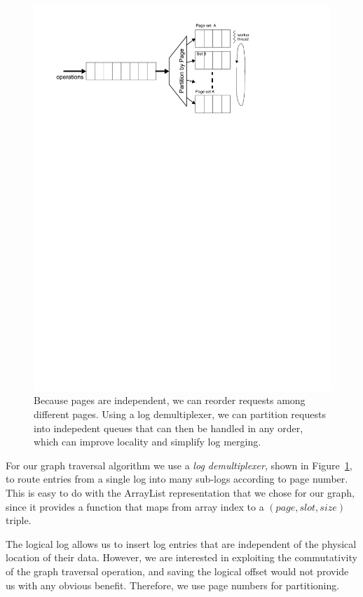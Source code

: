 \documentclass[10pt,letterpaper,twocolumn,english]{article}
\begin{document}
\begin{figure}
\includegraphics[width=1\columnwidth]{graph-traversal.pdf}
\caption{\sf\label{fig:multiplexor} Because pages are independent, we
can reorder requests among different pages. Using a log demultiplexer,
we can partition requests into indepedent queues that can then be
handled in any order, which can improve locality and simplify log
merging.}
\end{figure}

For our graph traversal algorithm we use a {\em log demultiplexer},
shown in Figure~\ref{fig:multiplexor}, to route entries from a single
log into many sub-logs according to page number.  This is easy to do
with the ArrayList representation that we chose for our graph, since
it provides a function that maps from
array index to a $(page, slot, size)$ triple.

The logical log allows us to insert log entries that are independent
of the physical location of their data.  However, we are
interested in exploiting the commutativity of the graph traversal
operation, and saving the logical offset would not provide us with any
obvious benefit.  Therefore, we use page numbers for partitioning.
\end{document}

